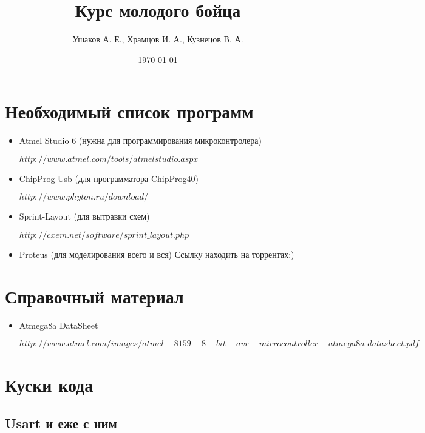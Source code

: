 \documentclass[12pt]{article}
\title{Курс молодого бойца}
\author{Ушаков А. Е., Храмцов И. А., Кузнецов В. А.}
\date{\today}
\begin{document}
\maketitle
\newpage
\tableofcontents
\newpage
\section{Необходимый список программ}
\begin{itemize}
\item Atmel Studio 6 (нужна для программирования микроконтролера) 

$http://www.atmel.com/tools/atmelstudio.aspx$
\item ChipProg Usb (для программатора ChipProg40) 

$http://www.phyton.ru/download/$
\item Sprint-Layout (для вытравки схем)

$http://cxem.net/software/sprint\_layout.php$
\item Proteus (для моделирования всего и вся) Ссылку находить на торрентах:)
\end{itemize}
\section{Справочный материал}
\begin{itemize}
\item Atmega8a DataSheet 

$http://www.atmel.com/images/atmel-8159-8-bit-avr-microcontroller-atmega8a\_datasheet.pdf$
\end{itemize}
\section{Куски кода}
\subsection{}
\subsection{}
\subsection{Usart и еже с ним}
\subsection{}
\end{document}
